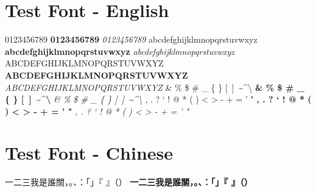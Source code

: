 \documentclass[10pt, a4paper, oneside]{article}
\begin{document}
\section{Test Font - English}
0123456789 \newline
\textbf{0123456789} \newline
\textit{0123456789} \newline
abcdefghijklmnopqrstuvwxyz \newline
\textbf{abcdefghijklmnopqrstuvwxyz} \newline
\textit{abcdefghijklmnopqrstuvwxyz} \newline
ABCDEFGHIJKLMNOPQRSTUVWXYZ \newline
\textbf{ABCDEFGHIJKLMNOPQRSTUVWXYZ} \newline
\textit{ABCDEFGHIJKLMNOPQRSTUVWXYZ} \newline
\& \% \$ \# \_ \{ \} [\ ]\ \textasciitilde \textasciicircum \textbackslash \newline
\textbf{\& \% \$ \# \_ \{ \} [\ ]\ \textasciitilde \textasciicircum \textbackslash} \newline
\textit{\& \% \$ \# \_ \{ \} [\ ]\ \textasciitilde \textasciicircum \textbackslash} \newline
, . ? ` ! @ * ( ) < > - + = ' " \newline
\textbf{, . ? ` ! @ * ( ) < > - + = ' "} \newline
\textit{, . ? ` ! @ * ( ) < > - + = ' "} \newline

\section{Test Font - Chinese}
一二三我是誰關，。、：「」『 』（）\newline
\textbf{一二三我是誰關，。、：「」『 』（）} \newline
\end{document}
